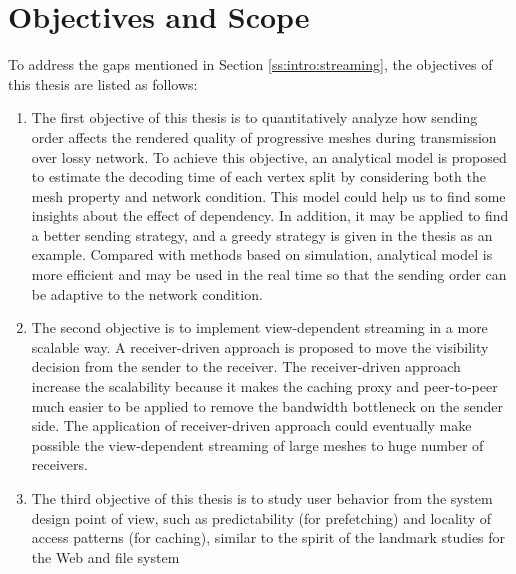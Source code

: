 \documentclass[11pt, a4paper]{report}
\begin{document}
    \section{Objectives and Scope}
    \label{s:intro:objectives}
    To address the gaps mentioned in Section \ref{ss:intro:streaming},  
    the objectives of this thesis are listed as follows: 
    \begin{enumerate}
        \item The first objective of this thesis is
            to quantitatively analyze how sending order affects
            the rendered quality of progressive meshes 
            during transmission over lossy network. 
            To achieve this objective, 
            an analytical model is proposed
            to estimate the decoding time of
            each vertex split by considering both
            the mesh property and network condition. 
            This model could help us to find some insights
            about the effect of dependency. 
            In addition, it may be applied to find a better sending strategy, 
            and a greedy strategy is given in the thesis as an example. 
            Compared with methods based on simulation, 
            analytical model is more efficient and may be used
            in the real time so that the sending order
            can be adaptive to the network condition.
        \item The second objective is to implement view-dependent streaming
            in a more scalable way. A receiver-driven approach is proposed 
            to move the visibility decision from the sender to the receiver.
            The receiver-driven approach increase the scalability
            because it makes the caching proxy and peer-to-peer much easier
            to be applied to remove the bandwidth bottleneck on the sender side.
            The application of receiver-driven approach could eventually
            make possible the view-dependent streaming of large meshes
            to huge number of receivers.
        \item
            The third objective of this thesis is to study user behavior from 
            the system design point of view, such as predictability (for prefetching)
            and locality of access patterns (for caching), similar to the spirit
            of the landmark studies for the Web \cite{huberman98web} and file system

\end{enumerate}
\end{document}
